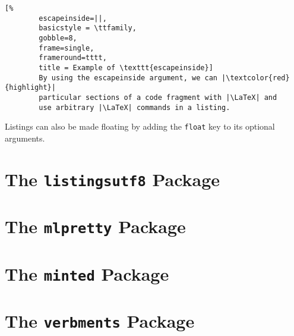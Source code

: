 \documentclass[article,a4paper,oneside,10pt]{memoir}
\newcommand\code[1]{\texttt{#1}}
\begin{document}
\begin{tcblisting}{}
    \begin{lstlisting}[%
        escapeinside=||,
        basicstyle = \ttfamily,
        gobble=8,
        frame=single,
        frameround=tttt,
        title = Example of \texttt{escapeinside}]
        By using the escapeinside argument, we can |\textcolor{red}{highlight}| 
        particular sections of a code fragment with |\LaTeX| and 
        use arbitrary |\LaTeX| commands in a listing.
    \end{lstlisting}
\end{tcblisting}

Listings  can also  be made  floating by  adding the  \code{float} key  to its
optional arguments.


\newpage
\chapter{The \code{listingsutf8}  Package \cite{listingsutf8}}
\label{chap:listingsutf8}


\chapter{The \code{mlpretty}      Package \cite{mlpretty}}
\label{chap:mlpretty}


\chapter{The \code{minted}        Package \cite{minted}}
\label{chap:minted}


\chapter{The \code{verbments}        Package \cite{verbments}}
\label{chap:minted}
\end{document}
